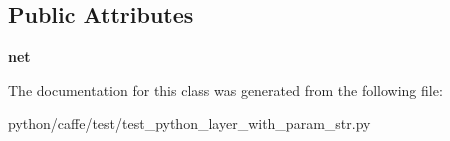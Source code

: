 \subsection*{Public Attributes}
\begin{DoxyCompactItemize}
\item 
\mbox{\label{classtest__python__layer__with__param__str_1_1_test_layer_with_param_a287416d4f120228daca3b04b8c5e1abd}} 
{\bfseries net}
\end{DoxyCompactItemize}


The documentation for this class was generated from the following file\+:\begin{DoxyCompactItemize}
\item 
python/caffe/test/test\+\_\+python\+\_\+layer\+\_\+with\+\_\+param\+\_\+str.\+py\end{DoxyCompactItemize}
